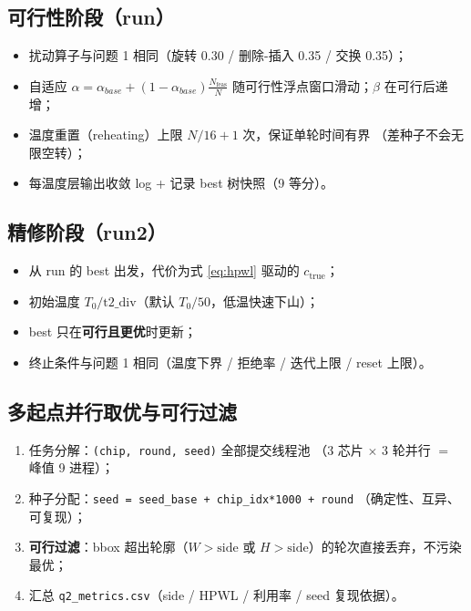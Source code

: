 \documentclass[12pt,a4paper]{article}
\begin{document}
\subsection{可行性阶段（run）}

\begin{itemize}
    \item 扰动算子与问题 1 相同（旋转 0.30 / 删除-插入 0.35 / 交换 0.35）；
    \item 自适应 $\alpha = \alpha_{base} + (1-\alpha_{base})\frac{N_{\text{feas}}}{N}$
    随可行性浮点窗口滑动；$\beta$ 在可行后递增；
    \item 温度重置（reheating）上限 $N/16 + 1$ 次，保证单轮时间有界
    （差种子不会无限空转）；
    \item 每温度层输出收敛 log + 记录 best 树快照（9 等分）。
\end{itemize}

\subsection{精修阶段（run2）}

\begin{itemize}
    \item 从 run 的 best 出发，代价为式 \eqref{eq:hpwl} 驱动的
    $c_{\text{true}}$；
    \item 初始温度 $T_0 / \text{t2\_div}$（默认 $T_0/50$，低温快速下山）；
    \item best 只在\textbf{可行且更优}时更新；
    \item 终止条件与问题 1 相同（温度下界 / 拒绝率 / 迭代上限 /
    reset 上限）。
\end{itemize}

\subsection{多起点并行取优与可行过滤}

\begin{enumerate}
    \item 任务分解：\texttt{(chip, round, seed)} 全部提交线程池
    （3 芯片 $\times$ 3 轮并行 $=$ 峰值 9 进程）；
    \item 种子分配：\texttt{seed = seed\_base + chip\_idx*1000 + round}
    （确定性、互异、可复现）；
    \item \textbf{可行过滤}：bbox 超出轮廓（$W > \text{side}$ 或
    $H > \text{side}$）的轮次直接丢弃，不污染最优；
    \item 汇总 \texttt{q2\_metrics.csv}（side / HPWL / 利用率 / seed 复现依据）。
\end{enumerate}
\end{document}
